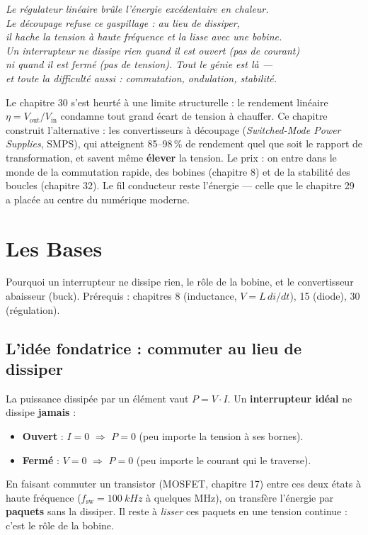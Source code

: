 \documentclass[12pt,a4paper,twoside]{book}
\begin{document}
\begin{center}
\textit{Le régulateur linéaire brûle l'énergie excédentaire en chaleur.\\
Le découpage refuse ce gaspillage : au lieu de dissiper,\\
il hache la tension à haute fréquence et la lisse avec une bobine.\\
Un interrupteur ne dissipe rien quand il est ouvert (pas de courant)\\
ni quand il est fermé (pas de tension). Tout le génie est là ---\\
et toute la difficulté aussi : commutation, ondulation, stabilité.}
\end{center}

\vspace{0.5cm}

Le chapitre 30 s'est heurté à une limite structurelle : le rendement linéaire $\eta = V_{\text{out}}/V_{\text{in}}$ condamne tout grand écart de tension à chauffer. Ce chapitre construit l'alternative : les convertisseurs à découpage (\textit{Switched-Mode Power Supplies}, SMPS), qui atteignent 85--98\,\% de rendement quel que soit le rapport de transformation, et savent même \textbf{élever} la tension. Le prix : on entre dans le monde de la commutation rapide, des bobines (chapitre 8) et de la stabilité des boucles (chapitre 32). Le fil conducteur reste l'énergie --- celle que le chapitre 29 a placée au centre du numérique moderne.

\section{Les Bases}

\begin{bases}
Pourquoi un interrupteur ne dissipe rien, le rôle de la bobine, et le convertisseur abaisseur (buck). Prérequis : chapitres 8 (inductance, $V = L\,di/dt$), 15 (diode), 30 (régulation).
\end{bases}

\subsection{L'idée fondatrice : commuter au lieu de dissiper}

\begin{formule}
La puissance dissipée par un élément vaut $P = V \cdot I$. Un \textbf{interrupteur idéal} ne dissipe \textbf{jamais} :
\begin{itemize}[nosep]
\item \textbf{Ouvert} : $I = 0$ $\Rightarrow$ $P = 0$ (peu importe la tension à ses bornes).
\item \textbf{Fermé} : $V = 0$ $\Rightarrow$ $P = 0$ (peu importe le courant qui le traverse).
\end{itemize}
En faisant commuter un transistor (MOSFET, chapitre 17) entre ces deux états à haute fréquence ($f_{\text{sw}} = \SI{100}{kHz}$ à quelques MHz), on transfère l'énergie par \textbf{paquets} sans la dissiper. Il reste à \textit{lisser} ces paquets en une tension continue : c'est le rôle de la bobine.
\end{formule}
\end{document}
